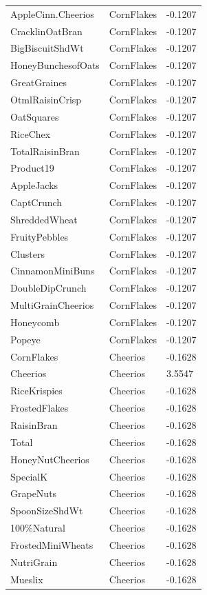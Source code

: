\begin{table}[!htbp]
\begin{tabular}{lll}
AppleCinn.Cheerios & CornFlakes & -0.1207
\\
CracklinOatBran & CornFlakes & -0.1207
\\
BigBiscuitShdWt & CornFlakes & -0.1207
\\
HoneyBunchesofOats & CornFlakes & -0.1207
\\
GreatGraines & CornFlakes & -0.1207
\\
OtmlRaisinCrisp & CornFlakes & -0.1207
\\
OatSquares & CornFlakes & -0.1207
\\
RiceChex & CornFlakes & -0.1207
\\
TotalRaisinBran & CornFlakes & -0.1207
\\
Product19 & CornFlakes & -0.1207
\\
AppleJacks & CornFlakes & -0.1207
\\
CaptCrunch & CornFlakes & -0.1207
\\
ShreddedWheat & CornFlakes & -0.1207
\\
FruityPebbles & CornFlakes & -0.1207
\\
Clusters & CornFlakes & -0.1207
\\
CinnamonMiniBuns & CornFlakes & -0.1207
\\
DoubleDipCrunch & CornFlakes & -0.1207
\\
MultiGrainCheerios & CornFlakes & -0.1207
\\
Honeycomb & CornFlakes & -0.1207
\\
Popeye & CornFlakes & -0.1207
\\
CornFlakes & Cheerios & -0.1628
\\
Cheerios & Cheerios & 3.5547
\\
RiceKrispies & Cheerios & -0.1628
\\
FrostedFlakes & Cheerios & -0.1628
\\
RaisinBran & Cheerios & -0.1628
\\
Total & Cheerios & -0.1628
\\
HoneyNutCheerios & Cheerios & -0.1628
\\
SpecialK & Cheerios & -0.1628
\\
GrapeNuts & Cheerios & -0.1628
\\
SpoonSizeShdWt & Cheerios & -0.1628
\\
100\%Natural & Cheerios & -0.1628
\\
FrostedMiniWheats & Cheerios & -0.1628
\\
NutriGrain & Cheerios & -0.1628
\\
Mueslix & Cheerios & -0.1628

\end{tabular}
\end{table}
